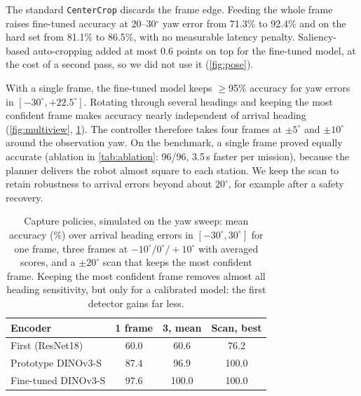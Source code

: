 The standard \texttt{CenterCrop} discards the frame edge. Feeding the whole frame raises fine-tuned accuracy at 20--30$^\circ$ yaw error from 71.3\% to 92.4\% and on the hard set from 81.1\% to 86.5\%, with no measurable latency penalty. Saliency-based auto-cropping added at most 0.6 points on top for the fine-tuned model, at the cost of a second pass, so we did not use it (\cref{fig:pose}).

With a single frame, the fine-tuned model keeps $\ge$95\% accuracy for yaw errors in $[-30^\circ, +22.5^\circ]$. Rotating through several headings and keeping the most confident frame makes accuracy nearly independent of arrival heading (\cref{fig:multiview}, \cref{tab:capture}). The controller therefore takes four frames at $\pm5^\circ$ and $\pm10^\circ$ around the observation yaw. On the benchmark, a single frame proved equally accurate (ablation in \cref{tab:ablation}: 96/96, 3.5\,s faster per mission), because the planner delivers the robot almost square to each station. We keep the scan to retain robustness to arrival errors beyond about $20^\circ$, for example after a safety recovery.

\begin{table}[tbp]
  \centering\small
  \setlength{\tabcolsep}{4pt}
  \begin{tabular}{@{}lccc@{}}
    \toprule
    Encoder & 1 frame & 3, mean & Scan, best \\
    \midrule
    First (ResNet18)            & 60.0 & 60.6  & 76.2 \\
    Prototype DINOv3-S          & 87.4 & 96.9  & 100.0 \\
    Fine-tuned DINOv3-S         & 97.6 & 100.0 & 100.0 \\
    \bottomrule
  \end{tabular}
  \caption{Capture policies, simulated on the yaw sweep: mean accuracy (\%) over arrival heading errors in $[-30^\circ, 30^\circ]$ for one frame, three frames at $-10^\circ/0^\circ/+10^\circ$ with averaged scores, and a $\pm20^\circ$ scan that keeps the most confident frame. Keeping the most confident frame removes almost all heading sensitivity, but only for a calibrated model: the first detector gains far less.}
  \label{tab:capture}
\end{table}

